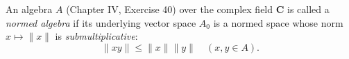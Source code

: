 An algebra $A$ (Chapter IV, Exercise 40) over the complex field $\mathbf{C}$ is called a \emph{normed algebra} if its underlying vector space $A_0$ is a normed space whose norm $x \mapsto \|x\|$ is \emph{submultiplicative}:
$$\|x y\| \leq \|x\| \|y\| \quad (x, y \in A).$$
